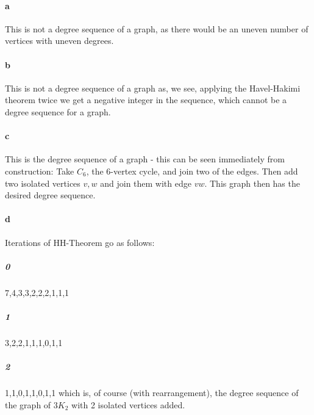 \paragraph{a} This is not a degree sequence of a graph, as there would be an uneven number of vertices with uneven degrees.
\paragraph{b} This is not a degree sequence of a graph as, we see, applying the Havel-Hakimi theorem twice we get a negative integer in the sequence, which cannot be a degree sequence for a graph.
\paragraph{c} This is the degree sequence of a graph - this can be seen immediately from construction: Take $C_6$, the 6-vertex cycle, and join two of the edges. Then add two isolated vertices $v,w$ and join them with edge $vw$. This graph then has the desired degree sequence.
\paragraph{d} Iterations of HH-Theorem go as follows:
\subparagraph{0} 7,4,3,3,2,2,2,1,1,1
\subparagraph{1}   3,2,2,1,1,1,0,1,1
\subparagraph{2}     1,1,0,1,1,0,1,1 which is, of course (with rearrangement), the degree sequence of the graph of $3K_2$ with 2 isolated vertices added.
